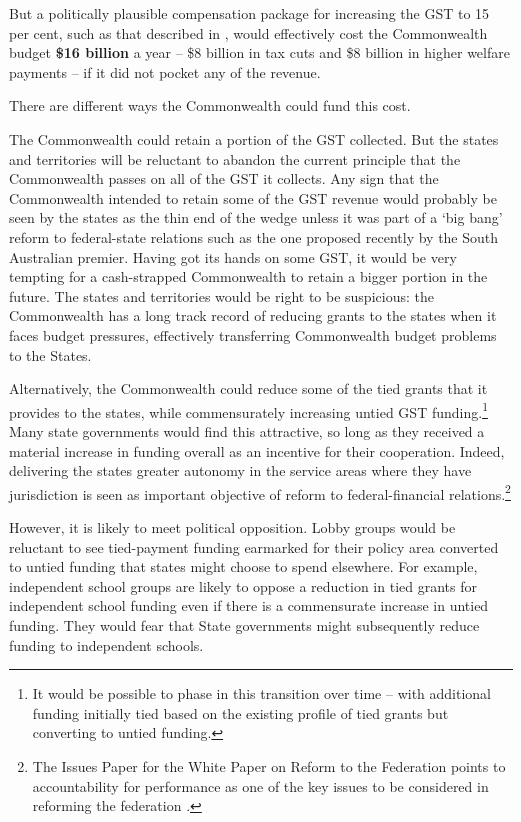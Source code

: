 But a politically plausible compensation package for increasing the GST to 15 per cent, such as that described in , would effectively cost the Commonwealth budget \textbf{\$16 billion} a year – \$8 billion in tax cuts and \$8 billion in higher welfare payments – if it did not pocket any of the revenue. 

There are different ways the Commonwealth could fund this cost. 

The Commonwealth could retain a portion of the GST collected. But the states and territories will be reluctant to abandon the current principle that the Commonwealth passes on all of the GST it collects. Any sign that the Commonwealth intended to retain some of the GST revenue would probably be seen by the states as the thin end of the wedge  unless it was part of a ‘big bang’ reform to federal-state relations such as the one proposed recently by the South Australian premier.  Having got its hands on some GST, it would be very tempting for a cash-strapped Commonwealth to retain a bigger portion in the future. The states and territories would be right to be suspicious: the Commonwealth has a long track record of reducing grants to the states when it faces budget pressures, effectively transferring Commonwealth budget problems to the States.

Alternatively, the Commonwealth could reduce some of the tied grants that it provides to the states, while commensurately increasing untied GST funding.\footnote{It would be possible to phase in this transition over time – with additional funding initially tied based on the existing profile of tied grants but converting to untied funding.}  Many state governments would find this attractive, so long as they received a material increase in funding overall as an incentive for their cooperation. Indeed, delivering the states greater autonomy in the service areas where they have jurisdiction is seen as important objective of reform to federal-financial relations.\footnote{The Issues Paper for the White Paper on Reform to the Federation points to accountability for performance as one of the key issues to be considered in reforming the federation \textcite[][13--25]{PrimeMinisterCabinet2014a}.}  

However, it is likely to meet political opposition. Lobby groups would be reluctant to see tied-payment funding earmarked for their policy area converted to untied funding that states might choose to spend elsewhere. For example, independent school groups are likely to oppose a reduction in tied grants for independent school funding even if there is a commensurate increase in untied funding. They would fear that State governments might subsequently reduce funding to independent schools.

